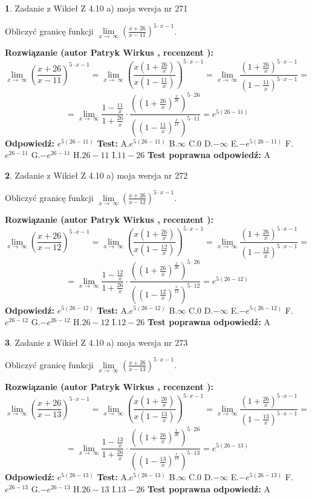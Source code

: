 \documentclass[12pt, a4paper]{article}
\theoremstyle{definition} %
\newtheorem{zad}{}
\newcommand{\zadStart}[1]{\begin{zad}#1\newline}
\newcommand{\zadStop}{\end{zad}}
\newcommand{\rozwStart}[2]{\noindent \textbf{Rozwiązanie (autor #1 , recenzent #2): }\newline}
\newcommand{\rozwStop}{\newline}
\newcommand{\odpStart}{\noindent \textbf{Odpowiedź:}\newline}
\newcommand{\odpStop}{\newline}
\newcommand{\testStart}{\noindent \textbf{Test:}\newline}
\newcommand{\testStop}{\newline}
\newcommand{\kluczStart}{\noindent \textbf{Test poprawna odpowiedź:}\newline}
\newcommand{\kluczStop}{\newline}
\begin{document}
\zadStart{Zadanie z Wikieł Z 4.10 a) moja wersja nr 271}


Obliczyć granicę funkcji  $\lim\limits_{x\to\ \infty}(\frac{x+26}{x-11})^{5\cdot x-1}$.
\zadStop
\rozwStart{Patryk Wirkus}{}
$$\lim\limits_{x\to\ \infty}(\frac{x+26}{x-11})^{5\cdot x-1} = \lim\limits_{x\to\ \infty}(\frac{x(1+\frac{26}{x})}{x(1-\frac{11}{x})})^{5\cdot x-1}=\lim\limits_{x\to\ \infty}\frac{(1+\frac{26}{x})^{5\cdot x-1}}{(1-\frac{11}{x})^{5\cdot x-1}}=$$
$$=\lim\limits_{x\to\ \infty}\frac{1-\frac{11}{x}}{1+\frac{26}{x}}\cdot\frac{((1+\frac{26}{x})^{\frac{x}{26}})^{5\cdot26}}{((1-\frac{11}{x})^{\frac{x}{11}})^{5\cdot11}}=e^{5(26-11)}$$
\rozwStop
\odpStart
$e^{5(26-11)}$
\odpStop
\testStart
A.$e^{5(26-11)}$ B.$\infty$ C.$0$ D.$-\infty$ E.$-e^{5(26-11)}$
F.$e^{26-11}$ G.$-e^{26-11}$
H.$26-11$
I.$11-26$
\testStop
\kluczStart
A
\kluczStop



\zadStart{Zadanie z Wikieł Z 4.10 a) moja wersja nr 272}


Obliczyć granicę funkcji  $\lim\limits_{x\to\ \infty}(\frac{x+26}{x-12})^{5\cdot x-1}$.
\zadStop
\rozwStart{Patryk Wirkus}{}
$$\lim\limits_{x\to\ \infty}(\frac{x+26}{x-12})^{5\cdot x-1} = \lim\limits_{x\to\ \infty}(\frac{x(1+\frac{26}{x})}{x(1-\frac{12}{x})})^{5\cdot x-1}=\lim\limits_{x\to\ \infty}\frac{(1+\frac{26}{x})^{5\cdot x-1}}{(1-\frac{12}{x})^{5\cdot x-1}}=$$
$$=\lim\limits_{x\to\ \infty}\frac{1-\frac{12}{x}}{1+\frac{26}{x}}\cdot\frac{((1+\frac{26}{x})^{\frac{x}{26}})^{5\cdot26}}{((1-\frac{12}{x})^{\frac{x}{12}})^{5\cdot12}}=e^{5(26-12)}$$
\rozwStop
\odpStart
$e^{5(26-12)}$
\odpStop
\testStart
A.$e^{5(26-12)}$ B.$\infty$ C.$0$ D.$-\infty$ E.$-e^{5(26-12)}$
F.$e^{26-12}$ G.$-e^{26-12}$
H.$26-12$
I.$12-26$
\testStop
\kluczStart
A
\kluczStop



\zadStart{Zadanie z Wikieł Z 4.10 a) moja wersja nr 273}


Obliczyć granicę funkcji  $\lim\limits_{x\to\ \infty}(\frac{x+26}{x-13})^{5\cdot x-1}$.
\zadStop
\rozwStart{Patryk Wirkus}{}
$$\lim\limits_{x\to\ \infty}(\frac{x+26}{x-13})^{5\cdot x-1} = \lim\limits_{x\to\ \infty}(\frac{x(1+\frac{26}{x})}{x(1-\frac{13}{x})})^{5\cdot x-1}=\lim\limits_{x\to\ \infty}\frac{(1+\frac{26}{x})^{5\cdot x-1}}{(1-\frac{13}{x})^{5\cdot x-1}}=$$
$$=\lim\limits_{x\to\ \infty}\frac{1-\frac{13}{x}}{1+\frac{26}{x}}\cdot\frac{((1+\frac{26}{x})^{\frac{x}{26}})^{5\cdot26}}{((1-\frac{13}{x})^{\frac{x}{13}})^{5\cdot13}}=e^{5(26-13)}$$
\rozwStop
\odpStart
$e^{5(26-13)}$
\odpStop
\testStart
A.$e^{5(26-13)}$ B.$\infty$ C.$0$ D.$-\infty$ E.$-e^{5(26-13)}$
F.$e^{26-13}$ G.$-e^{26-13}$
H.$26-13$
I.$13-26$
\testStop
\kluczStart
A
\kluczStop
\end{document}
